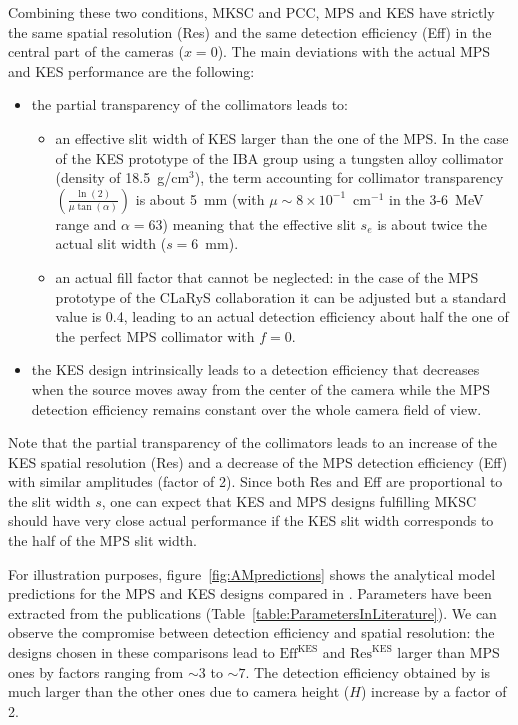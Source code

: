 \documentclass[a4paper,english,12pt]{article}
\newcommand\FOV{\textrm{Res}}
\newcommand\KES{\textrm{KES}}
\newcommand\du{}
\newcommand\DE{\textrm{Eff}}
\begin{document}
Combining these two conditions, MKSC and PCC, MPS and KES have strictly the same spatial resolution (Res) and the same detection efficiency (Eff) in the central part of the cameras ($x=0$). The main deviations with the actual MPS and KES performance are the following:
\begin{itemize}
	\item the partial transparency of the collimators leads to:
	\begin{itemize}
		\item an effective slit width of KES larger than the one of the MPS. In the case of the KES prototype of the IBA group using a tungsten alloy collimator (density of 18.5~g/cm$^3$), the term accounting for collimator transparency $\left(\frac{\ln(2)}{\mu \tan(\alpha)}\right)$ is about 5~mm (with $\mu\sim 8\times10^{-1}$~cm$^{-1}$ in the 3-6~MeV range and $\alpha=63$\textdegree) meaning that the effective slit $s_e$ is about twice the actual slit width ($s=6$~mm).
		\item an actual fill factor that cannot be neglected: in the case of the MPS prototype of the CLaRyS collaboration it can be adjusted but a standard value is 0.4, leading to an actual detection efficiency about half the one of the perfect MPS collimator with $f=0$.
	\end{itemize}
	\item the KES design intrinsically leads to a detection efficiency that decreases when the source moves away from the center of the camera while the MPS detection efficiency remains constant over the whole camera field of view.
\end{itemize}

Note that the partial transparency of the collimators leads to an increase of the KES spatial resolution (Res) and a decrease of the MPS detection efficiency (Eff) with similar amplitudes (factor of 2). Since both Res and Eff are proportional to the slit width $s$, one can expect that KES and MPS designs fulfilling MKSC should have very close actual performance if the KES slit width corresponds to the half of the MPS slit width.

For illustration purposes, figure~\ref{fig:AMpredictions} shows the analytical model predictions for the MPS and KES designs compared in \citep{Smeets2016, Lin2017, Park2017}. Parameters have been extracted from the publications (Table~\ref{table:ParametersInLiterature}). We can observe the compromise between detection efficiency and spatial resolution: the designs chosen in these comparisons lead to $\DE_{\du}^{\KES}$ and $\FOV_{\du}^{\KES}$ larger than MPS ones by factors ranging from $\sim3$ to $\sim7$. The detection efficiency obtained by \cite{Park2017} is much larger than the other ones due to camera height ($H$) increase by a factor of 2.
\end{document}
